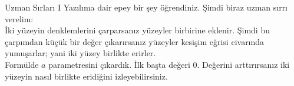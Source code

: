\begin{surferPage}{Uzman Sırları I}
Yazılıma dair epey bir şey öğrendiniz. Şimdi biraz uzman sırrı verelim:\\
\vspace{0.3cm}
İki yüzeyin denklemlerini çarparsanız yüzeyler birbirine eklenir. Şimdi bu çarpımdan küçük bir değer çıkarırsanız yüzeyler kesişim eğrisi civarında yumuşarlar; yani iki yüzey  birlikte erirler. \\
\vspace{0.3cm}
Formülde  $a$ parametresini çıkardık. İlk başta değeri 0. Değerini arttırırsanız iki yüzeyin nasıl birlikte eridiğini izleyebilirsiniz.
\end{surferPage}
